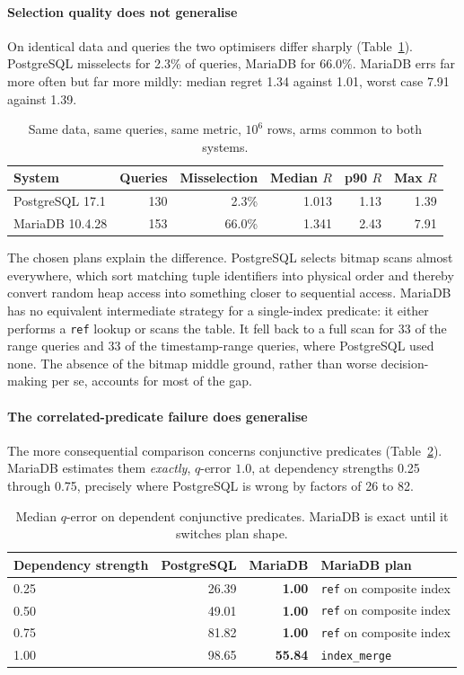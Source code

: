 \documentclass[preprint,12pt,authoryear]{elsarticle}
\begin{document}
\paragraph{Selection quality does not generalise}
On identical data and queries the two optimisers differ sharply
(Table~\ref{tab:crossdbms}). PostgreSQL misselects for 2.3\% of
queries, MariaDB for 66.0\%. MariaDB errs far more often but far more
mildly: median regret 1.34 against 1.01, worst case 7.91 against 1.39.

\begin{table}[htbp]
\centering
\caption{Same data, same queries, same metric, $10^6$ rows, arms common
to both systems.}
\label{tab:crossdbms}
\small
\begin{tabular}{@{}lrrrrr@{}}
\toprule
System & Queries & Misselection & Median $R$ & p90 $R$ & Max $R$ \\
\midrule
PostgreSQL 17.1 & 130 & 2.3\% & 1.013 & 1.13 & 1.39 \\
MariaDB 10.4.28 & 153 & 66.0\% & 1.341 & 2.43 & 7.91 \\
\bottomrule
\end{tabular}
\end{table}

The chosen plans explain the difference. PostgreSQL selects bitmap
scans almost everywhere, which sort matching tuple identifiers into
physical order and thereby convert random heap access into something
closer to sequential access. MariaDB has no equivalent intermediate
strategy for a single-index predicate: it either performs a
\texttt{ref} lookup or scans the table. It fell back to a full scan for
33 of the range queries and 33 of the timestamp-range queries, where
PostgreSQL used none. The absence of the bitmap middle ground, rather
than worse decision-making per se, accounts for most of the gap.

\paragraph{The correlated-predicate failure does generalise}
The more consequential comparison concerns conjunctive predicates
(Table~\ref{tab:crossconj}). MariaDB estimates them \emph{exactly},
$q$-error $1.0$, at dependency strengths 0.25 through 0.75, precisely
where PostgreSQL is wrong by factors of 26 to 82.

\begin{table}[htbp]
\centering
\caption{Median $q$-error on dependent conjunctive predicates. MariaDB
is exact until it switches plan shape.}
\label{tab:crossconj}
\small
\begin{tabular}{@{}lrrl@{}}
\toprule
Dependency strength & PostgreSQL & MariaDB & MariaDB plan \\
\midrule
0.25 & 26.39 & \textbf{1.00} & \texttt{ref} on composite index \\
0.50 & 49.01 & \textbf{1.00} & \texttt{ref} on composite index \\
0.75 & 81.82 & \textbf{1.00} & \texttt{ref} on composite index \\
1.00 & 98.65 & \textbf{55.84} & \texttt{index\_merge} \\
\bottomrule
\end{tabular}
\end{table}
\end{document}
